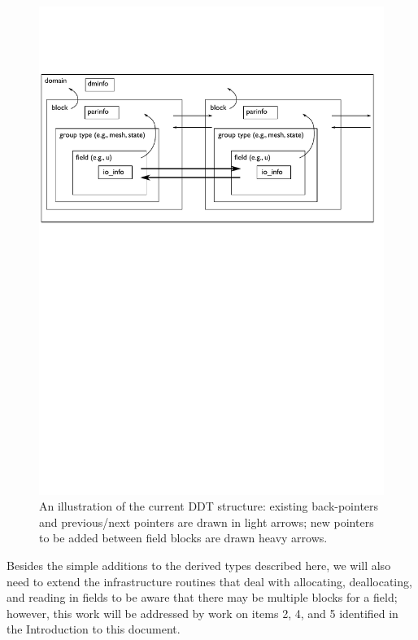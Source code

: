 \documentclass[11pt]{report}
\begin{document}
\begin{figure}[htb]
\begin{center}
\includegraphics[width=6.5in]{ddt_reorg.pdf}
\caption{An illustration of the current DDT structure: existing back-pointers and previous/next pointers are drawn in light arrows; new pointers to be added between field blocks are drawn heavy arrows.}
\end{center}
\end{figure}

Besides the simple additions to the derived types described here, we will also need to extend
the infrastructure routines that deal with allocating, deallocating, and reading in fields to be aware that there may be multiple
blocks for a field; however, this work will be addressed by work on items 2, 4, and 5 identified in the Introduction to this document.
\pagebreak
\end{document}
